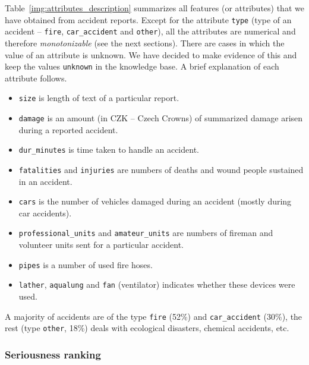 Table~\ref{img:attributes_description} summarizes all features (or attributes) that we have obtained from accident reports. Except for the attribute \verb+type+ (type of an accident -- \verb+fire+, \verb+car_accident+ and \verb+other+), all the attributes are numerical and therefore \emph{monotonizable} (see the next sections). There are cases in which the value of an attribute is unknown. We have decided to make evidence of this and keep the values \verb+unknown+ in the knowledge base. A brief explanation of each attribute follows.
\begin{itemize}
	\item \verb+size+ is length of text of a particular report.
	\item \verb+damage+ is an amount (in CZK -- Czech Crowns) of summarized damage arisen during a reported accident.
	\item \verb+dur_minutes+ is time taken to handle an accident.
	\item \verb+fatalities+ and \verb+injuries+ are numbers of deaths and wound people sustained in an accident.
	\item \verb+cars+ is the number of vehicles damaged during an accident (mostly during car accidents).
	\item \verb+professional_units+ and \verb+amateur_units+ are numbers of fireman and volunteer units sent for a particular accident.
	\item \verb+pipes+ is a number of used fire hoses.
	\item \verb+lather+, \verb+aqualung+ and \verb+fan+ (ventilator) indicates whether these devices were used.
\end{itemize}

A majority of accidents are of the type \verb+fire+ (52\%)
and \verb+car_accident+ (30\%),
the rest (type \verb+other+, 18\%)
deals with ecological disasters, chemical accidents, etc.

\subsubsection{Seriousness ranking} \label{sec:ch40_seriousness}


